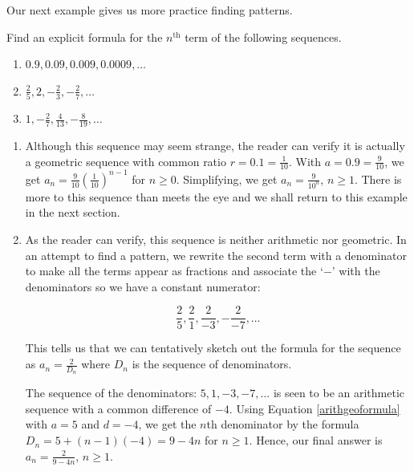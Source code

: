 \documentclass{ximera}
\begin{document}
Our next example gives us more practice finding patterns.



\begin{example}  \label{seqex2}  Find an explicit formula for the $n^{\text{th}}$ term of the following sequences.
\begin{enumerate}

\item  $0.9, 0.09, 0.009, 0.0009, \ldots$

\item  $\frac{2}{5}, 2, -\frac{2}{3}, -\frac{2}{7}, \ldots$

\item  $1, -\frac{2}{7}, \frac{4}{13}, -\frac{8}{19}, \ldots$

\end{enumerate}


\begin{explanation}

\begin{enumerate}



\item  Although this sequence may seem strange, the reader can verify it is actually a geometric sequence with common ratio $r = 0.1 = \frac{1}{10}$. With $a = 0.9 = \frac{9}{10}$, we get $a_{n} = \frac{9}{10} \left(\frac{1}{10}\right)^{n-1}$ for $n \geq 0$.  Simplifying, we get $a_{n} = \frac{9}{10^{n}}$, $n \geq 1$.  There is more to this sequence than meets the eye and we shall return to this example in the next section.
 

\item As the reader can verify, this sequence is neither arithmetic nor geometric.  In an attempt to find a pattern, we rewrite the second term with a denominator to make all the terms appear as fractions and associate the `$-$' with the denominators so we have a constant numerator:  

\[ \frac{2}{5}, \frac{2}{1}, \frac{2}{-3}, -\frac{2}{-7}, \ldots \]

 This tells us that we can tentatively sketch out the formula for the sequence as $a_{n} = \frac{2}{D_{n}}$ where $D_{n}$ is the sequence of denominators.  
 
The sequence of the denominators: $5,1,-3,-7, \ldots$ is seen to be an arithmetic sequence with a common difference of $-4$.   Using Equation \ref{arithgeoformula} with $a = 5$ and $d = -4$, we get the $n$th denominator by the formula $D_{n} = 5 + (n-1)(-4) = 9-4n$ for $n \geq 1$. Hence, our final answer is $a_{n} = \frac{2}{9-4n}$, $n \geq 1$.



\end{enumerate}
\end{explanation}
\end{example}
\end{document}
